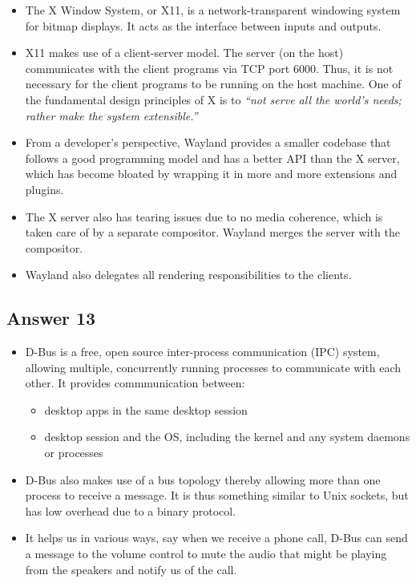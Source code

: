 \documentclass[]{article}
\begin{document}
\begin{itemize}
\itemsep1pt\parskip0pt
\item
  The X Window System, or X11, is a network-transparent windowing system
  for bitmap displays. It acts as the interface between inputs and
  outputs.
\item
  X11 makes use of a client-server model. The server (on the host)
  communicates with the client programs via TCP port 6000. Thus, it is
  not necessary for the client programs to be running on the host
  machine. One of the fundamental design principles of X is to
  \emph{``not serve all the world's needs; rather make the system
  extensible.''}
\item
  From a developer's perspective, Wayland provides a smaller codebase
  that follows a good programming model and has a better API than the X
  server, which has become bloated by wrapping it in more and more
  extensions and plugins.
\item
  The X server also has tearing issues due to no media coherence, which
  is taken care of by a separate compositor. Wayland merges the server
  with the compositor.
\item
  Wayland also delegates all rendering responsibilities to the clients.
\end{itemize}

\subsection{Answer 13}\label{answer-13}

\begin{itemize}
\itemsep1pt\parskip0pt
\item
  D-Bus is a free, open source inter-process communication (IPC) system,
  allowing multiple, concurrently running processes to communicate with
  each other. It provides commmunication between:

  \begin{itemize}
  \itemsep1pt\parskip0pt
  \item
    desktop apps in the same desktop session
  \item
    desktop session and the OS, including the kernel and any system
    daemons or processes
  \end{itemize}
\item
  D-Bus also makes use of a bus topology thereby allowing more than one
  process to receive a message. It is thus something similar to Unix
  sockets, but has low overhead due to a binary protocol.
\item
  It helps us in various ways, say when we receive a phone call, D-Bus
  can send a message to the volume control to mute the audio that might
  be playing from the speakers and notify us of the call.
\end{itemize}
\end{document}

